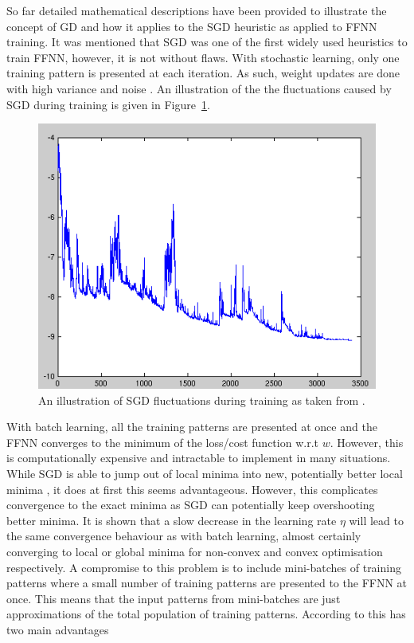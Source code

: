 So far detailed mathematical descriptions have been provided to illustrate the concept of \ac{GD} and how it applies to the \ac{SGD} heuristic as applied to \ac{FFNN} training. It was mentioned that \ac{SGD} was one of the first widely used heuristics to train \ac{FFNN}, however, it is not without flaws. With stochastic learning, only one training pattern is presented at each iteration. As such, weight updates are done with high variance and noise \cite{ref:ruder:2016}. An illustration of the the fluctuations caused by \ac{SGD} during training is given in Figure~\ref{fig:heuristics:gd:sgd}.

\begin{figure}[htbp]
      \includegraphics[width=\textwidth]{images/sgd.png}
      \caption{An illustration of \ac{SGD} fluctuations during training as taken from \cite{ref:sgd:2006}.}
      \label{fig:heuristics:gd:sgd}
\end{figure}

With batch learning, all the training patterns are presented at once and the \ac{FFNN} converges to the minimum of the loss/cost function w.r.t $w$. However, this is computationally expensive and intractable to implement in many situations. While \ac{SGD} is able to jump out of local minima into new, potentially better local minima \cite{ref:ruder:2016}, it does at first this seems advantageous. However, this complicates convergence to the exact minima as \ac{SGD} can potentially keep overshooting better minima. It is shown that a slow decrease in the learning rate $\eta$ will lead to the same convergence behaviour as with batch learning, almost certainly converging to local or global minima for non-convex and convex optimisation respectively. A compromise to this problem is to include mini-batches of training patterns where a small number of training patterns are presented to the \ac{FFNN} at once. This means that the input patterns from mini-batches are just approximations of the total population of training patterns. According to \citeauthor{ref:ruder:2016} \cite{ref:ruder:2016} this has two main advantages


